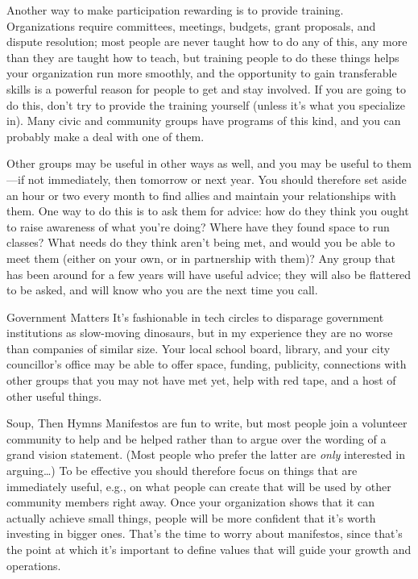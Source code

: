 Another way to make participation rewarding is to provide training.
Organizations require committees, meetings, budgets, grant proposals,
and dispute resolution; most people are never taught how to do any of
this, any more than they are taught how to teach, but training people to
do these things helps your organization run more smoothly, and the
opportunity to gain transferable skills is a powerful reason for people
to get and stay involved. If you are going to do this, don't try to
provide the training yourself (unless it's what you specialize in). Many
civic and community groups have programs of this kind, and you can
probably make a deal with one of them.

Other groups may be useful in other ways as well, and you may be useful
to them---if not immediately, then tomorrow or next year. You should
therefore set aside an hour or two every month to find allies and
maintain your relationships with them. One way to do this is to ask them
for advice: how do they think you ought to raise awareness of what
you're doing? Where have they found space to run classes? What needs
do they think aren't being met, and would you be able to meet them
(either on your own, or in partnership with them)? Any group that has
been around for a few years will have useful advice; they will also be
flattered to be asked, and will know who you are the next time you call.

\begin{aside}{Government Matters}
  It's fashionable in tech circles to disparage government institutions
  as slow-moving dinosaurs, but in my experience they are no worse than
  companies of similar size. Your local school board, library, and your
  city councillor's office may be able to offer space, funding,
  publicity, connections with other groups that you may not have met
  yet, help with red tape, and a host of other useful things.
\end{aside}

\begin{aside}{Soup, Then Hymns}
  Manifestos are fun to write, but most people join a volunteer
  community to help and be helped rather than to argue over the wording
  of a grand vision statement. (Most people who prefer the latter are
  \emph{only} interested in arguing{\ldots}) To be effective you should
  therefore focus on things that are immediately useful, e.g., on what
  people can create that will be used by other community members right
  away. Once your organization shows that it can actually achieve small
  things, people will be more confident that it's worth investing in
  bigger ones. That's the time to worry about manifestos, since that's
  the point at which it's important to define values that will guide
  your growth and operations.
\end{aside}

